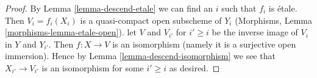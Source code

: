 \documentclass[10pt,a4paper]{amsart}
\theoremstyle{plain}
\theoremstyle{definition}
\theoremstyle{remark}
\numberwithin{equation}{subsection}
\begin{document}
\begin{proof}
By Lemma \ref{lemma-descend-etale} we can find an $i$ such that $f_i$
is \'etale. Then $V_i = f_i(X_i)$ is a quasi-compact open subscheme
of $Y_i$ (Morphisms, Lemma \ref{morphisms-lemma-etale-open}).
let $V$ and $V_{i'}$ for $i' \geq i$ be the inverse image of $V_i$
in $Y$ and $Y_{i'}$. Then $f : X \to V$ is an isomorphism
(namely it is a surjective open immersion). Hence by
Lemma \ref{lemma-descend-isomorphism} we see that
$X_{i'} \to V_{i'}$ is an isomorphism
for some $i' \geq i$ as desired.
\end{proof}
\end{document}

